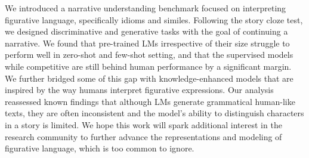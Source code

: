 We introduced a narrative understanding benchmark focused on interpreting figurative language, specifically idioms and similes. Following the story cloze test, we designed discriminative and generative tasks with the goal of continuing a narrative. We found that pre-trained LMs irrespective of their size struggle to perform well in zero-shot and few-shot setting, and that the supervised models while competitive are still behind human performance by a significant margin. We further bridged some of this gap with knowledge-enhanced models that are inspired by the way humans interpret figurative expressions. Our analysis reassessed known findings that although LMs generate grammatical human-like texts, they are often inconsistent and the model's ability to distinguish characters in a story is limited. We hope this work will spark additional interest in the research community to further advance the representations and modeling of figurative language, which is too common to ignore. 